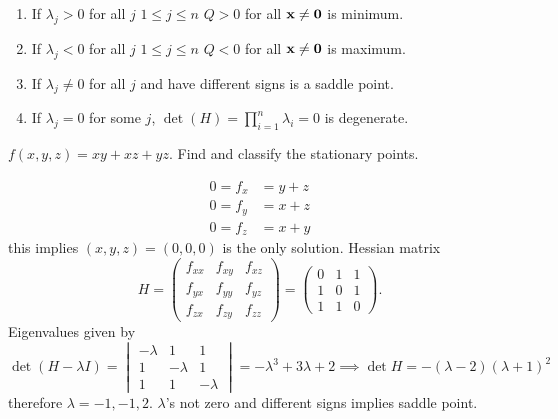 \documentclass[10pt, a4paper]{article}
\begin{document}
\begin{enumerate}[label = (\arabic*)]
    \item If $\lambda_j > 0$ for all $j$ $1 \leq j \leq n$ $Q > 0$ for all $\mathbf{x} \neq \mathbf{0}$ is minimum.
    
    \item If $\lambda_j < 0$ for all $j$ $1 \leq j \leq n$ $Q < 0$ for all $\mathbf{x} \neq \mathbf{0}$ is maximum.

    \item If $\lambda_j \neq 0$ for all $j$ and have different signs is a saddle point.

    \item If $\lambda_j = 0$ for some $j$,
    $\det(H) = \prod_{i = 1}^{n}\lambda_i = 0$ is degenerate.
\end{enumerate}

\begin{example}
    $f(x, y, z) = xy + xz + yz$.
    Find and classify the stationary points.

    \begin{solution}
        \begin{align*}
            0 = f_x &= y + z \\
            0 = f_y &= x + z \\
            0 = f_z &= x + y
        \end{align*}
        this implies $(x, y, z) = (0, 0, 0)$ is the only solution.
        Hessian matrix
        \[
        H = \begin{pmatrix}
            f_{xx} & f_{xy} & f_{xz} \\
            f_{yx} & f_{yy} & f_{yz} \\
            f_{zx} & f_{zy} & f_{zz}
        \end{pmatrix}
        =
        \begin{pmatrix}
            0 & 1 & 1 \\
            1 & 0 & 1 \\
            1 & 1 & 0
        \end{pmatrix}.
        \]
        Eigenvalues given by
        \[
        \det(H - \lambda I) = \begin{vmatrix}
            -\lambda & 1 & 1 \\
            1 & -\lambda & 1 \\
            1 & 1 & -\lambda
        \end{vmatrix} = -\lambda ^ 3 + 3\lambda + 2 \implies \det{H} = -(\lambda - 2)(\lambda + 1) ^ 2
        \]
        therefore $\lambda = -1, -1, 2$.
        $\lambda$'s not zero and different signs implies saddle point.
    \end{solution}
\end{example}
\end{document}
